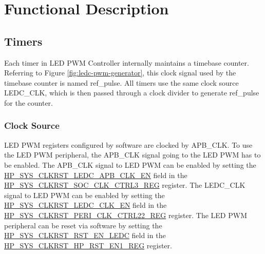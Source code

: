 \documentclass[main\_\_EN.tex]{subfiles}
\begin{document}
\section{Functional Description}
\subsection{Timers}\label{sec:ledc-timers}

Each timer in LED PWM Controller internally maintains a timebase counter. Referring to Figure \ref{fig:ledc-pwm-generator}, this clock signal used by the timebase counter is named ref\_pulse. All timers use the same clock source LEDC\_CLK, which is then passed through a clock divider to generate ref\_pulse for the counter.

\subsubsection{Clock Source}

    {LED PWM registers configured by software are clocked by APB\_CLK. To use the LED PWM peripheral, the APB\_CLK signal going to the LED PWM has to be enabled. The APB\_CLK signal to LED PWM can be enabled by setting the \hyperref[fielddesc:HPSYSCLKRSTLEDCAPBCLKEN]{HP\_SYS\_CLKRST\_LEDC\_APB\_CLK\_EN} field in the \hyperref[regdesc:HPSYSCLKRSTSOCCLKCTRL3REG]{HP\_SYS\_CLKRST\_SOC\_CLK\_CTRL3\_REG} register. The LEDC\_CLK signal to LED PWM can be enabled by setting the \hyperref[fielddesc:HPSYSCLKRSTLEDCCLKEN]{HP\_SYS\_CLKRST\_LEDC\_CLK\_EN} field in the \hyperref[regdesc:HPSYSCLKRSTPERICLKCTRL22REG]{HP\_SYS\_CLKRST\_PERI\_CLK\_CTRL22\_REG} register. The LED PWM peripheral can be reset via software by setting the \hyperref[fielddesc:HPSYSCLKRSTRSTENLEDC]{HP\_SYS\_CLKRST\_RST\_EN\_LEDC} field in the \hyperref[regdesc:HPSYSCLKRSTHPRSTEN1REG]{HP\_SYS\_CLKRST\_HP\_RST\_EN1\_REG} register.}
\end{document}
